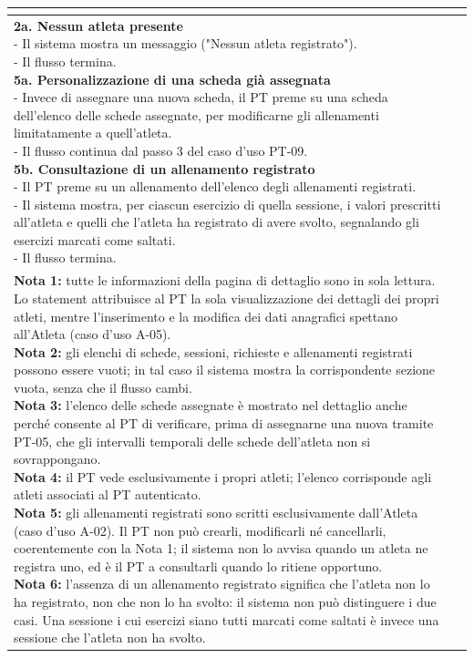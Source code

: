 \documentclass[../../../../SoftwareRequirementsSpecification.tex]{subfiles}
\begin{document}
\begin{tabularx}{\textwidth}{|l|X|}
{  } \\ \hline
  \ucaltflow{
    \textbf{2a. Nessun atleta presente} \newline
    - Il sistema mostra un messaggio ("Nessun atleta registrato"). \newline
    - Il flusso termina. \newline
    \textbf{5a. Personalizzazione di una scheda già assegnata} \newline
    - Invece di assegnare una nuova scheda, il PT preme su una scheda
    dell'elenco delle schede assegnate, per modificarne gli
    allenamenti limitatamente a quell'atleta. \newline
    - Il flusso continua dal passo 3 del caso d'uso PT-09. \newline
    \textbf{5b. Consultazione di un allenamento registrato} \newline
    - Il PT preme su un allenamento dell'elenco degli allenamenti
    registrati. \newline
    - Il sistema mostra, per ciascun esercizio di quella sessione, i
    valori prescritti all'atleta e quelli che l'atleta ha registrato
    di avere svolto, segnalando gli esercizi marcati come
    saltati. \newline
    - Il flusso termina.
  } \\ \hline
  \ucnote{
    \textbf{Nota 1:} tutte le informazioni della pagina di dettaglio
    sono in sola lettura. Lo statement attribuisce al PT la sola
    visualizzazione dei dettagli dei propri atleti, mentre
    l'inserimento e la modifica dei dati anagrafici spettano
    all'Atleta (caso d'uso A-05).\newline
    \textbf{Nota 2:} gli elenchi di schede, sessioni, richieste e
    allenamenti registrati possono essere vuoti; in tal caso il
    sistema mostra la corrispondente sezione vuota, senza che il
    flusso cambi.\newline
    \textbf{Nota 3:} l'elenco delle schede assegnate è mostrato nel
    dettaglio anche perché consente al PT di verificare, prima di
    assegnarne una nuova tramite PT-05, che gli intervalli temporali
    delle schede dell'atleta non si sovrappongano.\newline
    \textbf{Nota 4:} il PT vede esclusivamente i propri atleti;
    l'elenco corrisponde agli atleti associati al PT autenticato.\newline
    \textbf{Nota 5:} gli allenamenti registrati sono scritti
    esclusivamente dall'Atleta (caso d'uso A-02). Il PT non può
    crearli, modificarli né cancellarli, coerentemente con la Nota 1;
    il sistema non lo avvisa quando un atleta ne registra uno, ed è
    il PT a consultarli quando lo ritiene opportuno.\newline
    \textbf{Nota 6:} l'assenza di un allenamento registrato significa
    che l'atleta non lo ha registrato, non che non lo ha svolto: il
    sistema non può distinguere i due casi. Una sessione i cui
    esercizi siano tutti marcati come saltati è invece una sessione
    che l'atleta non ha svolto.
  } \\ \hline
\end{tabularx}
\end{document}
